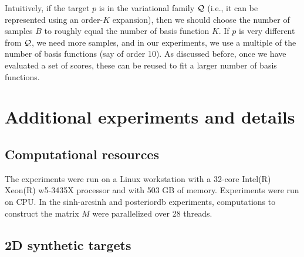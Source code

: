 Intuitively, if the target $p$ is in the variational family $\mathcal{Q}$ (i.e., it can be represented
using an order-$K$ expansion), then we should choose
the number of samples $B$ to roughly equal the number of basis function $K$.
%
If $p$ is very different from $\mathcal{Q}$, we need more samples, and in our experiments,
we use a multiple of the number of basis functions (say of order 10).  As discussed before, once we have evaluated a set of scores, these can be reused to fit a larger number of basis functions.



\section{Additional experiments and details}


\subsection{Computational resources}

The experiments were run on a Linux workstation with
a 32-core Intel(R) Xeon(R) w5-3435X processor
and with 503 GB of memory.
Experiments were run on CPU.
In the sinh-arcsinh and posteriordb experiments,
computations to construct the matrix $M$ were parallelized
over 28 threads.


\subsection{2D synthetic targets}
\label{ssec-2dsynthetic}

